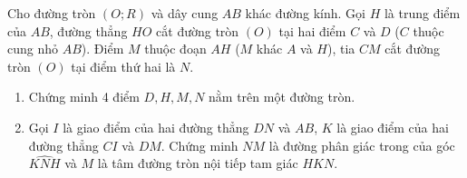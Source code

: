 \begin{ex}
Cho đường tròn $(O; R)$ và dây cung $AB$ khác đường kính. Gọi $H$ là trung điểm của $AB$, đường thẳng $HO$ cắt đường tròn $(O)$ tại hai điểm $C$ và $D$ ($C$ thuộc cung nhỏ $AB$). Điểm $M$ thuộc đoạn $AH$ ($M$ khác $A$ và $H$), tia $CM$ cắt đường tròn $(O)$ tại điểm thứ hai là $N$.
	\begin{enumerate}
		\item[a)] Chứng minh 4 điểm $D, H, M, N$ nằm trên một đường tròn.
		\item[b)] Gọi $I$ là giao điểm của hai đường thẳng $DN$ và $AB$, $K$ là giao điểm của hai đường thẳng $CI$ và $DM$. Chứng minh $NM$ là đường phân giác trong của góc $\widehat{KNH}$ và $M$ là tâm đường tròn nội tiếp tam giác $HKN$.
	\end{enumerate}
\end{ex}
